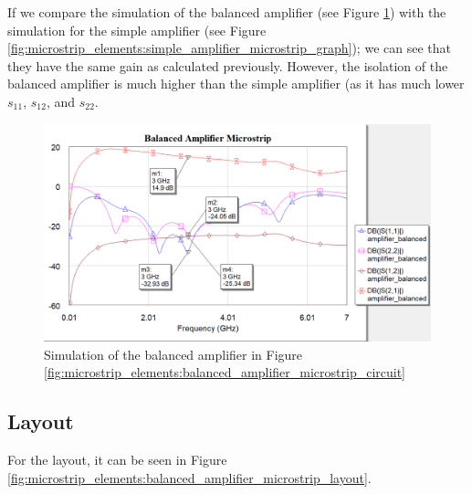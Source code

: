 \documentclass[12pt]{report} %
\begin{document}
If we compare the simulation of the balanced amplifier (see Figure \ref{fig:microstrip_elements:balanced_amplifier_microstrip_graph}) with the simulation for the simple amplifier (see Figure \ref{fig:microstrip_elements:simple_amplifier_microstrip_graph}); we can see that they have the same gain as calculated previously. However, the isolation of the balanced amplifier is much higher than the simple amplifier (as it has much lower $s_{11}$, $s_{12}$, and $s_{22}$. 

\begin{figure}[htbp]
    \centering
    \includegraphics[width=1\linewidth]{images//microstrip_elements/balanced_amplifier_microstrip_graph.png}
    \caption{Simulation of the balanced amplifier in Figure \ref{fig:microstrip_elements:balanced_amplifier_microstrip_circuit}}
    \label{fig:microstrip_elements:balanced_amplifier_microstrip_graph}
\end{figure}

\subsection{Layout}

For the layout, it can be seen in Figure \ref{fig:microstrip_elements:balanced_amplifier_microstrip_layout}.
\end{document}
